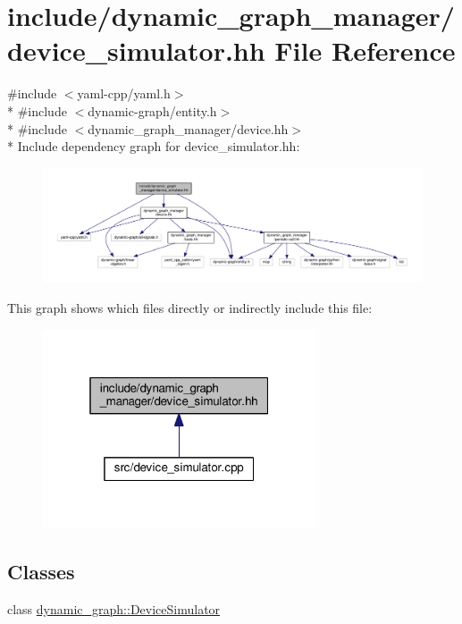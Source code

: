 \hypertarget{device__simulator_8hh}{}\section{include/dynamic\+\_\+graph\+\_\+manager/device\+\_\+simulator.hh File Reference}
\label{device__simulator_8hh}
{\ttfamily \#include $<$yaml-\/cpp/yaml.\+h$>$}\\*
{\ttfamily \#include $<$dynamic-\/graph/entity.\+h$>$}\\*
{\ttfamily \#include $<$dynamic\+\_\+graph\+\_\+manager/device.\+hh$>$}\\*
Include dependency graph for device\+\_\+simulator.\+hh\+:
\nopagebreak
\begin{figure}[H]
\begin{center}
\leavevmode
\includegraphics[width=350pt]{device__simulator_8hh__incl}
\end{center}
\end{figure}
This graph shows which files directly or indirectly include this file\+:
\nopagebreak
\begin{figure}[H]
\begin{center}
\leavevmode
\includegraphics[width=229pt]{device__simulator_8hh__dep__incl}
\end{center}
\end{figure}
\subsection*{Classes}
\begin{DoxyCompactItemize}
\item 
class \hyperlink{classdynamic__graph_1_1DeviceSimulator}{dynamic\+\_\+graph\+::\+Device\+Simulator}
\end{DoxyCompactItemize}
